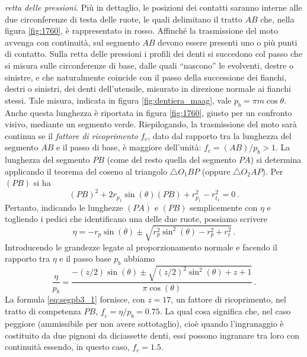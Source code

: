 {\em retta delle pressioni}.
Pi\`u in dettaglio, le posizioni dei contatti saranno interne alle due 
circonferenze di testa delle ruote, le quali delimitano il tratto $AB$ che,
nella figura \ref{fig:1760}, \`e rappresentato in rosso. Affinch\'e
la trasmissione del moto avvenga con continuit\`a, sul segmento $AB$ devono
essere presenti uno o pi\`u punti di contatto. Sulla retta delle pressioni
i profili dei denti si succedono col passo che si misura sulle circonferenze
di base, dalle quali ``nascono'' le evolventi, destre o sinistre,
 e che naturalmente coincide con il passo della  successione dei fianchi, 
destri o sinistri, dei denti dell'utensile, misurato in direzione normale ai
fianchi stessi. Tale misura, indicata in figura \ref{fig:dentiera_maag}, vale
$p_b=\pi m \cos \theta$. Anche questa lunghezza \`e riportata in 
figura \ref{fig:1760}, giusto per
un confronto visivo, mediante un segmento verde.
Riepilogando, la trasmissione del moto sar\`a continua se il 
{\em fattore di ricoprimento} $f_c$, dato
dal rapporto tra la lunghezza del segmento $AB$ e il passo di base, \`e
maggiore dell'unit\`a: $f_c=(AB)/p_b>1$.
 La lunghezza del segmento $PB$ (come del resto quella del segmento
$PA$) si determina applicando il teorema del coseno al triangolo $\triangle{O_1BP}$ (oppure $\triangle{O_2AP}$). Per $(PB)$ si ha
\begin{equation}
(PB)^2  +2r_{p_1}\sin( \theta)(PB)+r_{p_1}^2 - r_{t_1}^2=0\,.
\label{eq:segpb2}
\end{equation}
\noindent Pertanto, indicando le lunghezze $(PA)$ e $(PB)$ semplicemente
con $\eta$ e togliendo i pedici che identificano una delle due ruote, possiamo 
scrivere
\begin{equation}
\eta= -r_p\sin( \theta)\pm \sqrt{r_p^2\sin^2(\theta)-r_p^2 + r_t^2}\,.
\label{eq:segpb3}
\end{equation}
\noindent Introducendo le grandezze legate al proporzionamento normale 
e facendo il rapporto tra $\eta$ e il passo base $p_b$ abbiamo
\begin{equation}
\frac{\eta}{p_b}= \frac{-(z/2)\sin( \theta)\pm \sqrt{(z/2)^2\sin^2(\theta)+ z+1}}{\pi \cos (\theta)}\,.
\label{eq:segpb3_1}
\end{equation}
\noindent La formula \ref{eq:segpb3_1} fornisce,
con  $z=17$, un fattore di ricoprimento,
nel tratto di competenza $PB$, $\underline f_c=\eta/p_b=0.75$. La qual cosa  significa
che, nel caso peggiore (ammissibile per non avere sottotaglio),
cio\`e quando l'ingranaggio \`e costituito da due pignoni da diciassette denti,
essi possono ingranare tra loro con continuit\`a essendo, in questo caso,
$f_c=1.5$.

